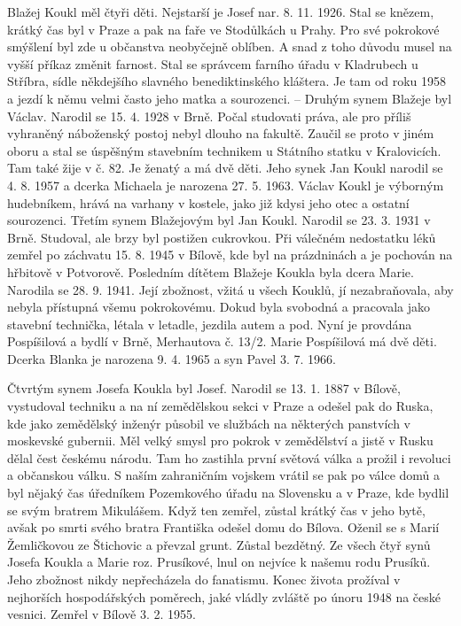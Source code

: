 \documentclass[../dejiny-rodu-prusiku.tex]{subfiles}
\begin{document}
Blažej Koukl měl čtyři děti. Nejstarší je Josef nar. 8. 11. 1926. Stal se knězem, krátký čas byl v Praze a pak na faře ve Stodůlkách u Prahy. Pro své pokrokové smýšlení byl zde u občanstva neobyčejně oblíben. A snad z toho důvodu musel na vyšší příkaz změnit farnost. Stal se správcem farního úřadu v Kladrubech u Stříbra, sídle někdejšího slavného benediktinského kláštera. Je tam od roku 1958 a jezdí k němu velmi často jeho matka a sourozenci. – Druhým synem Blažeje byl Václav. Narodil se 15. 4. 1928 v Brně. Počal  studovati práva, ale pro příliš vyhraněný náboženský postoj nebyl dlouho na fa­kultě. Zaučil se proto v jiném oboru a stal se úspěšným stavebním technikem u Státního statku v Kralovicích. Tam také žije v č. 82. Je ženatý a má dvě děti. Jeho synek Jan Koukl narodil se 4. 8. 1957 a dcerka Michaela je narozena 27. 5. 1963. Václav Koukl je výborným hudebníkem, hrává na varhany v kostele, jako již kdysi je­ho otec a ostatní sourozenci. Třetím synem Blažejovým byl Jan Koukl. Narodil se 23. 3. 1931 v Brně. Studoval, ale brzy byl postižen cukrovkou. Při válečném nedostat­ku léků zemřel po záchvatu 15. 8. 1945 v Bílově, kde byl na prázdninách a je pochován na hřbitově v Potvorově. Posledním dítětem Blažeje Koukla byla dcera Marie. Narodila se 28. 9. 1941. Její zbožnost, vžitá u všech Kouklů, jí nezabraňovala, aby nebyla přístupná všemu pokrokovému. Dokud byla svobodná a pracovala jako sta­vební technička, létala v letadle, jezdila autem a pod. Nyní je provdána Pospíšilová a bydlí v Brně, Merhautova č. 13/2. Marie Pospíšilová má dvě děti. Dcerka Blanka je narozena 9. 4. 1965 a syn Pavel 3. 7. 1966.

Čtvrtým synem Josefa Koukla byl Josef. Narodil se 13. 1. 1887 v Bílově, vystudoval techniku a na ní zemědělskou sekci v Praze a odešel pak do Ruska, kde jako zeměděl­ský inženýr působil ve službách na některých panstvích v moskevské gubernii. Měl velký smysl pro pokrok v ze­mědělství a jistě v Rusku dělal čest českému národu. Tam ho zastihla první světová válka a prožil i revolu­ci a občanskou válku. S naším zahraničním vojskem vrátil se pak po válce domů a byl nějaký čas úředníkem Pozemkového úřadu na Slovensku a v Praze, kde bydlil se svým bratrem Mikulášem. Když ten zemřel, zůstal krátký čas v jeho bytě, avšak po smrti svého bratra Františka odešel domu do Bílova. Oženil se s Marií Žemličkovou ze Štichovic a převzal grunt. Zůstal bezdětný. Ze všech čtyř synů Josefa Koukla a Marie roz. Prusíkové, lnul on nejvíce k našemu rodu Prusíků. Jeho zbožnost nikdy nepřecházela do fanatismu. Konec života prožíval v nejhorších hospodářských poměrech, jaké vládly zvláště po únoru 1948 na české vesnici. Zemřel v Bílově 3. 2. 1955.
\end{document}
